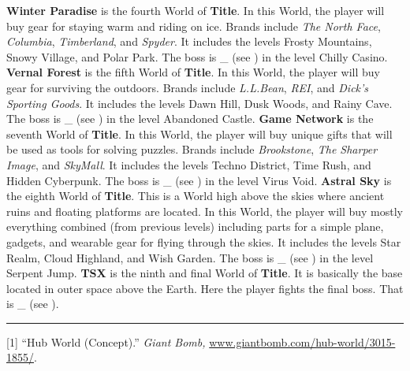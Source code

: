 \documentclass[11pt]{article}
\begin{document}
	\textbf{Winter Paradise} is the fourth World of \textbf{Title}. \iffalse This is an ice-based World that features \_. \fi In this World, the player will buy gear for staying warm and riding on ice. Brands include \textit{The North Face}, \textit{Columbia}, \textit{Timberland}, and \textit{Spyder}. It includes the levels Frosty Mountains, Snowy Village, and Polar Park. The boss is \_ (see ) in the level Chilly Casino. \newline \newline
	\textbf{Vernal Forest} is the fifth World of \textbf{Title}. \iffalse This is a forest-themed World that features \_. \fi In this World, the player will buy gear for surviving the outdoors. Brands include \textit{L.L.Bean}, \textit{REI}, and \textit{Dick's Sporting Goods}. It includes the levels Dawn Hill, Dusk Woods, and Rainy Cave. The boss is \_ (see ) in the level Abandoned Castle. \newline \newline
	\textbf{Game Network} is the seventh World of \textbf{Title}. \iffalse This is a cyberspace-based World that features \_. \fi In this World, the player will buy unique gifts that will be used as tools for solving puzzles. Brands include \textit{Brookstone}, \textit{The Sharper Image}, and \textit{SkyMall}. It includes the levels Techno District, Time Rush, and Hidden Cyberpunk. The boss is \_ (see ) in the level Virus Void. \newline \newline
	\textbf{Astral Sky} is the eighth World of \textbf{Title}. This is a World high above the skies where ancient ruins and floating platforms are located. In this World, the player will buy mostly everything combined (from previous levels) including parts for a simple plane, gadgets, and wearable gear for flying through the skies. It includes the levels Star Realm, Cloud Highland, and Wish Garden. The boss is \_ (see ) in the level Serpent Jump. \newline \newline
	\textbf{TSX} is the ninth and final World of \textbf{Title}. It is basically the base located in outer space above the Earth. Here the player fights the final boss. That is \_ (see ).
	\vfill
	\hrule
	\vspace{0.25cm} %
	[1] ``Hub World (Concept).'' \textit{Giant Bomb,} \href{www.giantbomb.com/hub-world/3015-1855/}{www.giantbomb.com/hub-world/3015-1855/}.
	\newpage
\end{document}
